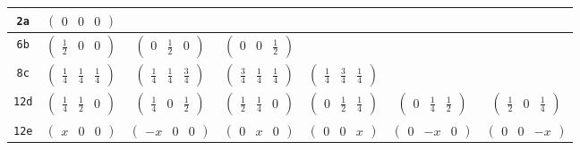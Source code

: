 \documentclass[fleqn,9pt,landscape]{jsarticle}
\begin{document}
\begin{center}
\begin{longtable}{ccccccc}
{\tt 2a} & $ \begin{pmatrix} 0 & 0 & 0 \end{pmatrix} $ & $  $ & $  $ & $  $ & $  $ & $  $ \\ \hline
{\tt 6b} & $ \begin{pmatrix} \frac{1}{2} & 0 & 0 \end{pmatrix} $ & $ \begin{pmatrix} 0 & \frac{1}{2} & 0 \end{pmatrix} $ & $ \begin{pmatrix} 0 & 0 & \frac{1}{2} \end{pmatrix} $ & $  $ & $  $ & $  $ \\ \hline
{\tt 8c} & $ \begin{pmatrix} \frac{1}{4} & \frac{1}{4} & \frac{1}{4} \end{pmatrix} $ & $ \begin{pmatrix} \frac{1}{4} & \frac{1}{4} & \frac{3}{4} \end{pmatrix} $ & $ \begin{pmatrix} \frac{3}{4} & \frac{1}{4} & \frac{1}{4} \end{pmatrix} $ & $ \begin{pmatrix} \frac{1}{4} & \frac{3}{4} & \frac{1}{4} \end{pmatrix} $ & $  $ & $  $ \\ \hline
{\tt 12d} & $ \begin{pmatrix} \frac{1}{4} & \frac{1}{2} & 0 \end{pmatrix} $ & $ \begin{pmatrix} \frac{1}{4} & 0 & \frac{1}{2} \end{pmatrix} $ & $ \begin{pmatrix} \frac{1}{2} & \frac{1}{4} & 0 \end{pmatrix} $ & $ \begin{pmatrix} 0 & \frac{1}{2} & \frac{1}{4} \end{pmatrix} $ & $ \begin{pmatrix} 0 & \frac{1}{4} & \frac{1}{2} \end{pmatrix} $ & $ \begin{pmatrix} \frac{1}{2} & 0 & \frac{1}{4} \end{pmatrix} $ \\ \hline
{\tt 12e} & $ \begin{pmatrix} x & 0 & 0 \end{pmatrix} $ & $ \begin{pmatrix} - x & 0 & 0 \end{pmatrix} $ & $ \begin{pmatrix} 0 & x & 0 \end{pmatrix} $ & $ \begin{pmatrix} 0 & 0 & x \end{pmatrix} $ & $ \begin{pmatrix} 0 & - x & 0 \end{pmatrix} $ & $ \begin{pmatrix} 0 & 0 & - x \end{pmatrix} $ \\ \hline

\end{longtable}
\end{center}
\end{document}
